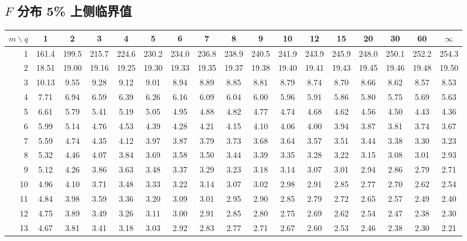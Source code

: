 \subsection{\texorpdfstring{$F$}{F} 分布 5\% 上侧临界值}
\begin{center}\scriptsize\setlength{\tabcolsep}{2.6pt}\renewcommand{\arraystretch}{1.0}\label{tab:f05}
\begin{tabular}{r|cccccccccccccccc}\toprule
$m\backslash q$ & 1 & 2 & 3 & 4 & 5 & 6 & 7 & 8 & 9 & 10 & 12 & 15 & 20 & 30 & 60 & $\infty$\\\midrule
1 & 161.4 & 199.5 & 215.7 & 224.6 & 230.2 & 234.0 & 236.8 & 238.9 & 240.5 & 241.9 & 243.9 & 245.9 & 248.0 & 250.1 & 252.2 & 254.3\\
2 & 18.51 & 19.00 & 19.16 & 19.25 & 19.30 & 19.33 & 19.35 & 19.37 & 19.38 & 19.40 & 19.41 & 19.43 & 19.45 & 19.46 & 19.48 & 19.50\\
3 & 10.13 & 9.55 & 9.28 & 9.12 & 9.01 & 8.94 & 8.89 & 8.85 & 8.81 & 8.79 & 8.74 & 8.70 & 8.66 & 8.62 & 8.57 & 8.53\\
4 & 7.71 & 6.94 & 6.59 & 6.39 & 6.26 & 6.16 & 6.09 & 6.04 & 6.00 & 5.96 & 5.91 & 5.86 & 5.80 & 5.75 & 5.69 & 5.63\\
5 & 6.61 & 5.79 & 5.41 & 5.19 & 5.05 & 4.95 & 4.88 & 4.82 & 4.77 & 4.74 & 4.68 & 4.62 & 4.56 & 4.50 & 4.43 & 4.36\\
6 & 5.99 & 5.14 & 4.76 & 4.53 & 4.39 & 4.28 & 4.21 & 4.15 & 4.10 & 4.06 & 4.00 & 3.94 & 3.87 & 3.81 & 3.74 & 3.67\\
7 & 5.59 & 4.74 & 4.35 & 4.12 & 3.97 & 3.87 & 3.79 & 3.73 & 3.68 & 3.64 & 3.57 & 3.51 & 3.44 & 3.38 & 3.30 & 3.23\\
8 & 5.32 & 4.46 & 4.07 & 3.84 & 3.69 & 3.58 & 3.50 & 3.44 & 3.39 & 3.35 & 3.28 & 3.22 & 3.15 & 3.08 & 3.01 & 2.93\\
9 & 5.12 & 4.26 & 3.86 & 3.63 & 3.48 & 3.37 & 3.29 & 3.23 & 3.18 & 3.14 & 3.07 & 3.01 & 2.94 & 2.86 & 2.79 & 2.71\\
10 & 4.96 & 4.10 & 3.71 & 3.48 & 3.33 & 3.22 & 3.14 & 3.07 & 3.02 & 2.98 & 2.91 & 2.85 & 2.77 & 2.70 & 2.62 & 2.54\\
11 & 4.84 & 3.98 & 3.59 & 3.36 & 3.20 & 3.09 & 3.01 & 2.95 & 2.90 & 2.85 & 2.79 & 2.72 & 2.65 & 2.57 & 2.49 & 2.40\\
12 & 4.75 & 3.89 & 3.49 & 3.26 & 3.11 & 3.00 & 2.91 & 2.85 & 2.80 & 2.75 & 2.69 & 2.62 & 2.54 & 2.47 & 2.38 & 2.30\\
13 & 4.67 & 3.81 & 3.41 & 3.18 & 3.03 & 2.92 & 2.83 & 2.77 & 2.71 & 2.67 & 2.60 & 2.53 & 2.46 & 2.38 & 2.30 & 2.21\\

\end{tabular}
\end{center}
